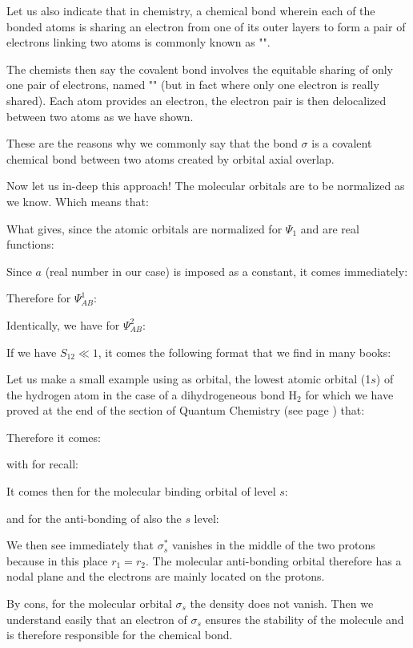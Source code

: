 	Let us also indicate that in chemistry, a chemical bond wherein each of the bonded atoms is sharing an electron from one of its outer layers to form a pair of electrons linking two atoms is commonly known as "".
	
	The chemists then say the covalent bond involves the equitable sharing of only one pair of electrons, named "" (but in fact where only one electron is really shared). Each atom provides an electron, the electron pair is then delocalized between two atoms as we have shown.

	These are the reasons why we commonly say that the bond $\sigma$ is a covalent chemical bond between two atoms created by orbital axial overlap.

	Now let us in-deep this approach! The molecular orbitals are to be normalized as we know. Which means that:
	
		What gives, since the atomic orbitals are normalized for $\Psi_1$ and are real functions:
	
	Since $a$ (real number in our case) is imposed as a constant, it comes immediately:
	
	Therefore for $\Psi_{AB}^1$:
	
	Identically, we have for $\Psi_{AB}^2$:
	
	If we have $S_{12}\ll 1$, it comes the following format that we find in many books:
	
	Let us make a small example using as orbital, the lowest atomic orbital (1$s$) of the hydrogen atom in the case of a dihydrogeneous bond $\mathrm{H}_2$ for which we have proved at the end of the section of Quantum Chemistry (see page \pageref{atomic orbitals of hydrogen atom}) that:
	
	Therefore it comes:
	
	with for recall:
	
	It comes then for the molecular binding orbital of level $s$:
	
	and for the anti-bonding of also the $s$ level:
	
	We then see immediately that $\sigma^*_s$ vanishes in the middle of the two protons because in this place $r_1=r_2$. The molecular anti-bonding orbital therefore has a nodal plane and the electrons are mainly located on the protons.
	
	By cons, for the molecular orbital $\sigma_s$ the density does not vanish. Then we understand easily that an electron of $\sigma_s$ ensures the stability of the molecule and is therefore responsible for the chemical bond.
	
